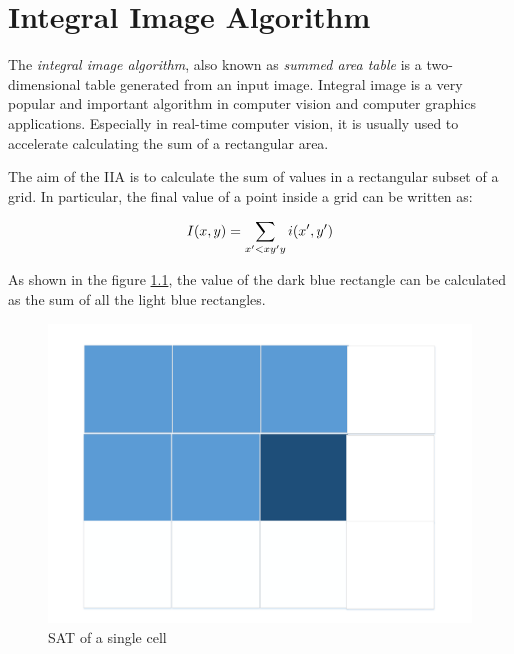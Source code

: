 

\chapter{Integral Image Algorithm}
 The \textit{integral image algorithm}, also known as \textit{summed area table} is a two-dimensional table generated from an input image. Integral image is a very popular and important algorithm in computer vision and computer graphics applications. Especially in real-time computer vision, it is usually used to accelerate calculating the sum of a rectangular area. 
 
  The aim of the IIA is to calculate the sum of values in a rectangular subset of a grid. In particular, the final value of a point inside a grid can be written as:
  
  \begin{equation} \label{eq:IIA eq}
  I(x,y)=\sum\limits_{x'<x \\ y'y}  i(x',y')
  \end{equation}
   
   As shown in the figure \ref{fig:IIA}, the value of the dark blue rectangle can be calculated as the sum of all the light blue rectangles.
   
 
  	\begin{figure}[h]
  		\centering
  	 \includegraphics[scale=0.25]{imm/iia/Disegno1}  
   \caption{SAT of a single cell}
   \label{fig:IIA}
\end{figure}
  
